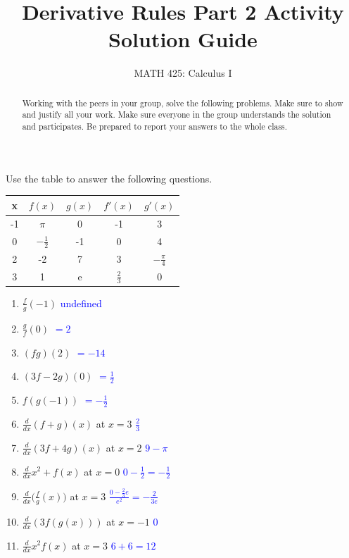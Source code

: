 \documentclass{ximera}
\title{Derivative Rules Part 2 Activity Solution Guide}
\author{MATH 425: Calculus I}
\begin{document}
\begin{abstract}
    Working with the peers in your group, solve the following problems. Make sure to show and justify all your work. Make sure everyone in the group understands the solution and participates. Be prepared to report your answers to the whole class. 
\end{abstract}
\maketitle

\begin{exercise}
    Use the table to answer the following questions.\\  
    \begin{tabular}{c|c|c|c|c}
        x  & $f(x)$ & $g(x)$ & $f'(x)$ & $g'(x)$   \\ \hline
        -1  & $\pi$ & 0 & -1 & 3\\ \hline
        0 & $-\frac12$ & -1 & 0 & 4\\ \hline
        2 & -2 & 7 & 3 & $-\frac{\pi}{4}$ \\ \hline
        3 & 1 & e & $\frac23$ & 0\\%
    \end{tabular}
    \begin{enumerate}
       \item $\frac{f}{g}(-1)$ \textcolor{blue}{ undefined}
        \item $\frac{g}{f}(0)$ \textcolor{blue}{ $=2$}
        \item $(fg)(2)$ \textcolor{blue}{ $=-14$}
        \item $(3f-2g)(0)$ \textcolor{blue}{ $=\frac12$}
        \item $f(g(-1))$ \textcolor{blue}{ $=-\frac12$}
        \item $\frac{d}{dx} (f+g)(x)$ at $x=3$ \textcolor{blue}{ $\frac23$}
        \item $\frac{d}{dx} (3f+4g)(x)$ at $x=2$ \textcolor{blue}{ $9-\pi$}
        \item $\frac{d}{dx} x^2+f(x)$ at $x=0$ \textcolor{blue}{ $0-\frac12=-\frac12$}
        \item $\frac{d}{dx} \big(\frac{f}{g}(x)\big)$ at $x=3$ \textcolor{blue}{ $\frac{0-\frac{2}{3}e}{e^2}=-\frac{2}{3e}$}
        \item $\frac{d}{dx} (3f(g(x)))$ at $x=-1$ \textcolor{blue}{ $0$}
        \item $\frac{d}{dx} x^2f(x)$ at $x=3$ \textcolor{blue}{ $6+6=12$}
    \end{enumerate}
\end{exercise}
\end{document}
